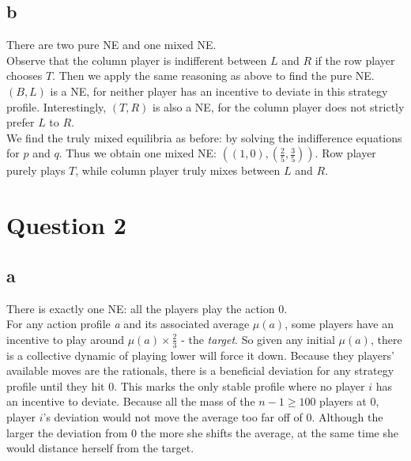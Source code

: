 \documentclass[10pt,a4paper]{article}
\begin{document}
\subsection*{b}
There are two pure NE and one mixed NE.\\
Observe that the column player is indifferent between $L$ and $R$ if the row player chooses $T$. Then we apply the same reasoning as above to find the pure NE. $(B,L)$ is a NE, for neither player has an incentive to deviate in this strategy profile. Interestingly, $(T,R)$ is also a NE, for the column player does not strictly prefer $L$ to $R$.\\
We find the truly mixed equilibria as before: by solving the indifference equations for $p$ and $q$.
Thus we obtain one mixed NE: $((1,0),(\tfrac{2}{5},\tfrac{3}{5}))$. Row player purely plays $T$, while column player truly mixes between $L$ and $R$.
\section*{Question 2}
\subsection*{a}
There is exactly one NE: all the players play the action $0$. \\
For any action profile \textit{a} and its associated average $\mu(\textit{a})$, some players have an incentive to play around $\mu(\textit{a})\times \tfrac{2}{3}$ - the \textit{target}. So given any initial $\mu(\textit{a})$, there is a collective dynamic of playing lower will force it down. Because they players' available moves are the rationals, there is a beneficial deviation for any strategy profile until they hit $0$. This marks the only stable profile where no player $i$ has an incentive to deviate. Because all the mass of the $n-1\geq 100$ players at $0$, player $i$'s deviation would not move the average too far off of $0$. Although the larger the deviation from $0$ the more she shifts the average, at the same time she would distance herself from the target.
\end{document}
